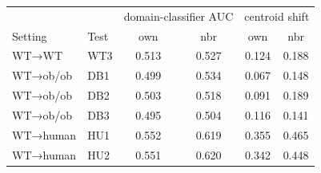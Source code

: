 \begin{tabular}{llcc|cc}
\toprule
 & & \multicolumn{2}{c|}{domain-classifier AUC} & \multicolumn{2}{c}{centroid shift} \\
Setting & Test & own & nbr & own & nbr \\
\midrule
WT→WT & WT3 & 0.513 & 0.527 & 0.124 & 0.188 \\
WT→ob/ob & DB1 & 0.499 & 0.534 & 0.067 & 0.148 \\
WT→ob/ob & DB2 & 0.503 & 0.518 & 0.091 & 0.189 \\
WT→ob/ob & DB3 & 0.495 & 0.504 & 0.116 & 0.141 \\
WT→human & HU1 & 0.552 & 0.619 & 0.355 & 0.465 \\
WT→human & HU2 & 0.551 & 0.620 & 0.342 & 0.448 \\
\bottomrule
\end{tabular}
